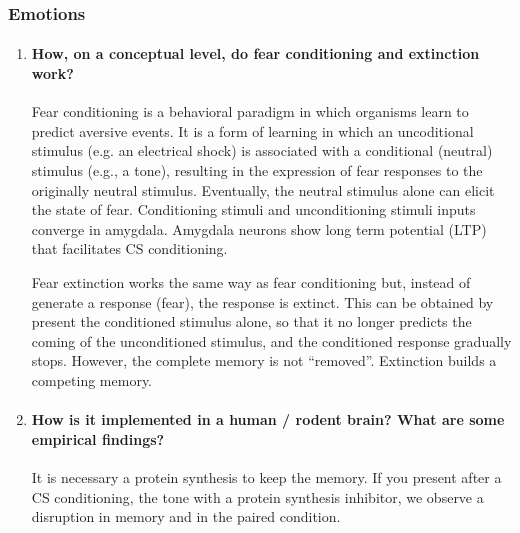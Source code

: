 \documentclass[12pt,article,oneside,a4paper]{memoir}
\begin{document}
\subsubsection{Emotions}
\begin{enumerate}
\item \paragraph{How, on a conceptual level, do fear conditioning and
extinction work?}
Fear conditioning is a behavioral paradigm in which organisms learn to predict
aversive events. It is a form of learning in which an uncoditional stimulus
(e.g. an electrical shock) is associated with a conditional (neutral) stimulus
(e.g., a tone), resulting in the expression of fear responses to the originally
neutral stimulus. Eventually, the neutral stimulus alone can elicit the state
of fear. Conditioning stimuli and unconditioning stimuli inputs converge in
amygdala. Amygdala neurons show long term potential (LTP) that facilitates CS
conditioning.

Fear extinction works the same way as fear conditioning but, instead of generate
a response (fear), the response is extinct. This can be obtained by present the
conditioned stimulus alone, so that it no longer predicts the coming of the
unconditioned stimulus, and the conditioned response gradually stops. However,
the complete memory is not ``removed''. Extinction builds a competing memory.

\item \paragraph{How is it implemented in a human / rodent brain? What are some
empirical findings?}

It is necessary a protein synthesis to keep the memory. If you present after a CS conditioning, the tone with a protein synthesis inhibitor, we observe a disruption in memory and in the paired condition.

\end{enumerate}

\end{document}
